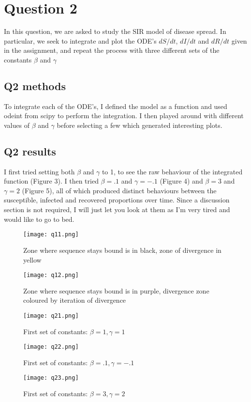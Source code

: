 \documentclass[apj]{emulateapj}
\begin{document}
\section{Question 2}
\label{sec:Question 2}

In this question, we are asked to study the SIR model of disease spread. In particular, we seek to integrate and plot the ODE's $dS/dt$,    $dI/dt$   and   $dR/dt$ given in the assignment, and repeat the process with three different sets of the constants $\beta$ and $\gamma$

\subsection{Q2 methods}
\label{sec:Q2 methods}

To integrate each of the ODE's, I defined the model as a function and used odeint from scipy to perform the integration. I then played around with different values of $\beta$ and $\gamma$ before selecting a few which generated interesting plots.

\subsection{Q2 results}
\label{sec:Q2 results}
I first tried setting both $\beta$ and $\gamma$ to 1, to see the raw behaviour of the integrated function (Figure 3). 
I then tried $\beta = .1$ and $\gamma = -.1$ (Figure 4) and $\beta = 3$ and $\gamma = 2$ (Figure 5), all of which produced distinct behaviours between the susceptible, infected and recovered proportions over time. Since a discussion section is not required, I will just let you look at them as I'm very tired and would like to go to bed.

\begin{figure}
\texttt{[image: q11.png]}
\caption{Zone where sequence stays bound is in black, zone of divergence in yellow}
\label{fig:figureOfSpectrum}

\texttt{[image: q12.png]}
\caption{Zone where sequence stays bound is in purple, divergence zone coloured by iteration of divergence}
\label{fig:figureOfSpectrum}
\end{figure}


\begin{figure}
\texttt{[image: q21.png]}
\caption{First set of constants: $\beta=1, \gamma=1$}
\label{fig:figureOfSpectrum}

\texttt{[image: q22.png]}
\caption{First set of constants: $\beta=.1, \gamma=-.1$}
\label{fig:figureOfSpectrum}

\texttt{[image: q23.png]}
\caption{First set of constants: $\beta=3, \gamma=2$}
\label{fig:figureOfSpectrum}
\end{figure}




 




\end{document}
